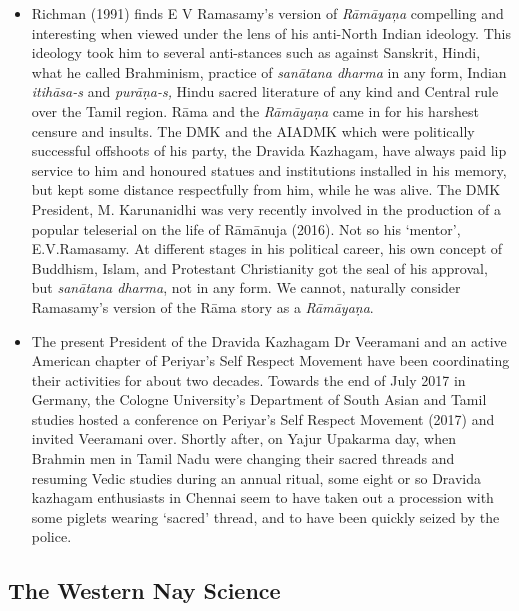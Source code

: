 \begin{itemize}
 \item Richman (1991) finds E V Ramasamy’s version of \textit{Rāmāyaņa} compelling and interesting when viewed under the lens of his anti-North Indian ideology. This ideology took him to several anti-stances such as against Sanskrit, Hindi, what he called Brahminism, practice of \textit{sanātana dharma} in any form, Indian \textit{itihāsa-s} and \textit{purāṇa-s,} Hindu sacred literature of any kind and Central rule over the Tamil region. Rāma and the \textit{Rāmāyaṇa} came in for his harshest censure and insults. The DMK and the AIADMK which were politically successful offshoots of his party, the Dravida Kazhagam, have always paid lip service to him and honoured statues and institutions installed in his memory, but kept some distance respectfully from him, while he was alive. The DMK President, M. Karunanidhi was very recently involved in the production of a popular teleserial on the life of Rāmānuja (2016). Not so his ‘mentor’, E.V.Ramasamy. At different stages in his political career, his own concept of Buddhism, Islam, and Protestant Christianity got the seal of his approval, but \textit{sanātana dharma}, not in any form. We cannot, naturally consider Ramasamy’s version of the Rāma story as a \textit{Rāmāyaṇa}.

 \item The present President of the Dravida Kazhagam Dr Veeramani and an active American chapter of Periyar’s Self Respect Movement have been coordinating their activities for about two decades. Towards the end of July 2017 in Germany, the Cologne University’s Department of South Asian and Tamil studies hosted a conference on Periyar’s Self Respect Movement (2017) and invited Veeramani over. Shortly after, on Yajur Upakarma day, when Brahmin men in Tamil Nadu were changing their sacred threads and resuming Vedic studies during an annual ritual, some eight or so Dravida kazhagam enthusiasts in Chennai seem to have taken out a procession with some piglets wearing ‘sacred’ thread, and to have been quickly seized by the police.

\end{itemize}

\newpage

\subsection*{The Western Nay Science}

